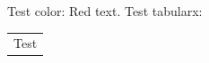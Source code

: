 \documentclass{ui1activity}
\begin{document}
Test color: {\color{uired} Red text}.
Test tabularx:
\begin{tabularx}{\linewidth}{X}
    Test \\
\end{tabularx}
\end{document}
